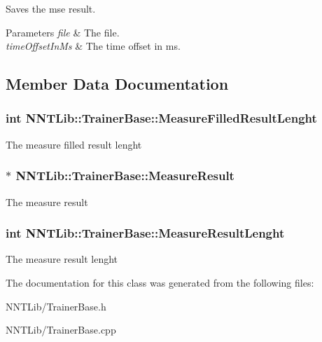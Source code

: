 Saves the mse result. 


\begin{DoxyParams}{Parameters}
{\em file} & The file.\\
\hline
{\em time\+Offset\+In\+Ms} & The time offset in ms.\\
\hline
\end{DoxyParams}


\subsection{Member Data Documentation}
\hypertarget{class_n_n_t_lib_1_1_trainer_base_a813093150b33e456c99428f2a4191c66}{}
\subsubsection[{Measure\+Filled\+Result\+Lenght}]{\setlength{\rightskip}{0pt plus 5cm}int N\+N\+T\+Lib\+::\+Trainer\+Base\+::\+Measure\+Filled\+Result\+Lenght}\label{class_n_n_t_lib_1_1_trainer_base_a813093150b33e456c99428f2a4191c66}


The measure filled result lenght 

\hypertarget{class_n_n_t_lib_1_1_trainer_base_a557584860d1e68175e6902b4095cefde}{}
\subsubsection[{Measure\+Result}]{$\ast$ N\+N\+T\+Lib\+::\+Trainer\+Base\+::\+Measure\+Result}\label{class_n_n_t_lib_1_1_trainer_base_a557584860d1e68175e6902b4095cefde}


The measure result 

\hypertarget{class_n_n_t_lib_1_1_trainer_base_a7077caabdc27417bbb200537f6a8bcda}{}
\subsubsection[{Measure\+Result\+Lenght}]{\setlength{\rightskip}{0pt plus 5cm}int N\+N\+T\+Lib\+::\+Trainer\+Base\+::\+Measure\+Result\+Lenght}\label{class_n_n_t_lib_1_1_trainer_base_a7077caabdc27417bbb200537f6a8bcda}


The measure result lenght 



The documentation for this class was generated from the following files\+:\begin{DoxyCompactItemize}
\item 
N\+N\+T\+Lib/Trainer\+Base.\+h\item 
N\+N\+T\+Lib/Trainer\+Base.\+cpp\end{DoxyCompactItemize}

